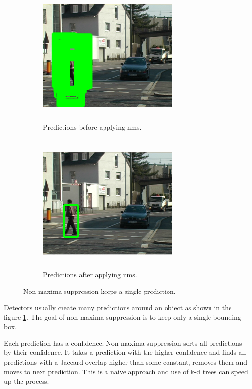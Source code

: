 \documentclass[a4paper,11pt,titlepage,twoside]{article}
\numberwithin{figure}{section}
\begin{document}
\begin{figure}[h!]
	\begin{subfigure}[Sample1]{0.5\linewidth}
    	\includegraphics[height=70mm, width=70mm]{fig/nms1.png} 
        \caption{Predictions before applying nms.}
        \label{fig:nms1}   
    \end{subfigure}
    \quad
    \begin{subfigure}[Sample1]{0.5\linewidth} 
    	\includegraphics[height=70mm, width=70mm]{fig/nms2.png}
        \caption{Predictions after applying nms.}   
        \label{fig:nms2}
    \end{subfigure} 
\caption{Non maxima suppression\cite{diez2011non} keeps a single prediction.}
\label{fig:nms}
\end{figure}

Detectors usually create many predictions around an object as shown in the figure \ref{fig:nms1}. The goal of non-maxima suppression is to keep only a single bounding box. 

Each prediction has a confidence. Non-maxima suppression sorts all predictions by their confidence. It takes a prediction with the higher confidence and finds all predictions with a Jaccard overlap\cite{tan2005introduction} higher than some constant, removes them and moves to next prediction. This is a naive approach and use of k-d trees can speed up the process.
\end{document}
